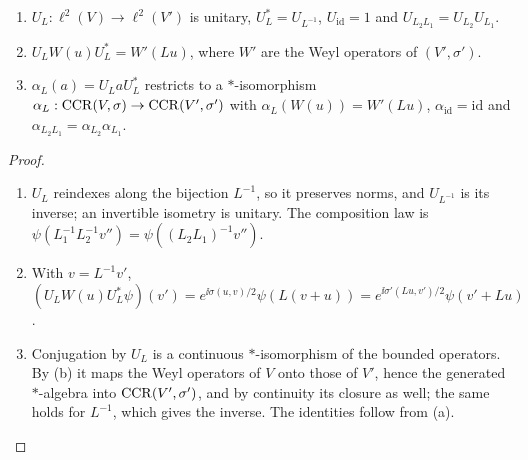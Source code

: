 \begin{proposition}[Relabelling]\label{prop:relabel}
\begin{enumerate}[label=(\alph*),leftmargin=2.5em]
\item $U_L:\ell^2(V)\to\ell^2(V')$ is unitary, $U_L^*=U_{L^{-1}}$, $U_{\mathrm{id}}=1$ and
$U_{L_2L_1}=U_{L_2}U_{L_1}$.
\item $U_LW(u)U_L^*=W'(Lu)$, where $W'$ are the Weyl operators of $(V',\sigma')$.
\item $\alpha_L(a)=U_LaU_L^*$ restricts to a $*$-isomorphism
$\alpha_L:\operatorname{CCR}(V,\sigma)\to\operatorname{CCR}(V',\sigma')$ with $\alpha_L(W(u))=W'(Lu)$,
$\alpha_{\mathrm{id}}=\mathrm{id}$ and $\alpha_{L_2L_1}=\alpha_{L_2}\alpha_{L_1}$.
\end{enumerate}
\end{proposition}
\begin{proof}
\begin{enumerate}[leftmargin=2.5em]
\item[(a)] $U_L$ reindexes along the bijection $L^{-1}$, so it preserves norms, and $U_{L^{-1}}$ is its
inverse; an invertible isometry is unitary. The composition law is
$\psi(L_1^{-1}L_2^{-1}v'')=\psi((L_2L_1)^{-1}v'')$.
\item[(b)] With $v=L^{-1}v'$,
$(U_LW(u)U_L^*\psi)(v')=e^{\ii\sigma(u,v)/2}\psi(L(v+u))=e^{\ii\sigma'(Lu,v')/2}\psi(v'+Lu)$.
\item[(c)] Conjugation by $U_L$ is a continuous $*$-isomorphism of the bounded operators. By (b) it
maps the Weyl operators of $V$ onto those of $V'$, hence the generated $*$-algebra into
$\operatorname{CCR}(V',\sigma')$, and by continuity its closure as well; the same holds for $L^{-1}$, which
gives the inverse. The identities follow from (a).
\end{enumerate}
\end{proof}

\begin{remark}\label{rem:antisymplectic}
 
\end{remark}


